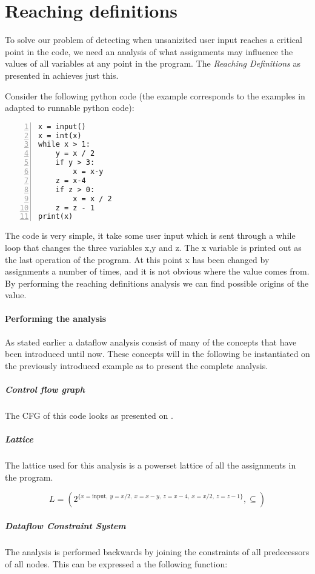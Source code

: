 \section{Reaching definitions}
To solve our problem of detecting when unsanizited user input reaches a critical point in the code, we need an analysis of what assignments may influence the values of all variables at any point in the program.
The \emph{Reaching Definitions} as presented in \citet[p.~26]{schwartzbach} achieves just this.

Consider the following python code (the example corresponds to the examples in \citet{schwartzbach} adapted to runnable python code):
\begin{lstlisting}[numbers=left, frame=single, linewidth=6cm]
x = input()
x = int(x)
while x > 1:
    y = x / 2
    if y > 3:
        x = x-y
    z = x-4
    if z > 0:
        x = x / 2
    z = z - 1
print(x)
\end{lstlisting}

The code is very simple, it take some user input which is sent through a while loop that changes the three variables x,y and z.
The x variable is printed out as the last operation of the program.
At this point x has been changed by assignments a number of times, and it is not obvious where the value comes from.
By performing the reaching definitions analysis we can find possible origins of the value.

\paragraph{Performing the analysis}
As stated earlier a dataflow analysis consist of many of the concepts that have been introduced until now.
These concepts will in the following be instantiated on the previously introduced example as to present the complete analysis.

\subparagraph{Control flow graph}
The CFG of this code looks as presented on .

\subparagraph{Lattice}
The lattice used for this analysis is a powerset lattice of all the assignments in the program.

\[ L = ( 2^{ \{x = \text{input}, ~ y = x/2, ~ x = x-y, ~ z=x-4, ~ x = x/2, ~ z = z-1 \} } , \subseteq ) \]


\subparagraph{Dataflow Constraint System}
The analysis is performed backwards by joining the constraints of all predecessors of all nodes.
This can be expressed a the following function:

